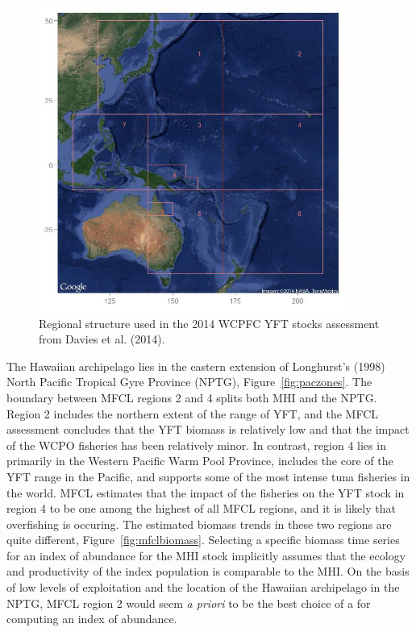 \documentclass[12pt,letterpaper]{article}
\begin{document}
\begin{figure}
\begin{center}
\includegraphics[width=0.9\textwidth]{./MFCLregions.png}
\caption{\label{fig:mfclregions}
Regional structure used in the 2014 WCPFC YFT stocks assessment from
Davies et al. (2014).
}
\end{center}
\end{figure}

The Hawaiian archipelago lies in the eastern extension of Longhurst's
(1998) North Pacific Tropical Gyre Province (NPTG), 
Figure~\ref{fig:paczones}.
The boundary between MFCL regions 2 and 4 splits both MHI and the NPTG.
Region 2 includes the northern extent of the range of YFT, and the MFCL
assessment concludes that the YFT biomass is relatively low and that
the impact of the WCPO fisheries has been relatively minor.
In contrast, region 4 lies in primarily in the Western Pacific Warm
Pool Province, includes the core of the YFT range in the Pacific,
and supports some of the most intense tuna fisheries in the world.
MFCL estimates that the impact of the fisheries on the YFT stock in
region 4 to be one among the highest of all MFCL regions, and it is
likely that overfishing is occuring.
The estimated biomass trends in these two regions are quite different,
Figure~\ref{fig:mfclbiomass}.
Selecting a specific biomass time series for an
index of abundance for the MHI stock implicitly assumes
that the ecology and productivity of the index population 
is comparable to the MHI.
On the basis of low levels of exploitation and the location of the
Hawaiian archipelago in the NPTG, MFCL region 2 would seem {\it a
priori} to be the best choice of a for computing an index of
abundance.
\end{document}
